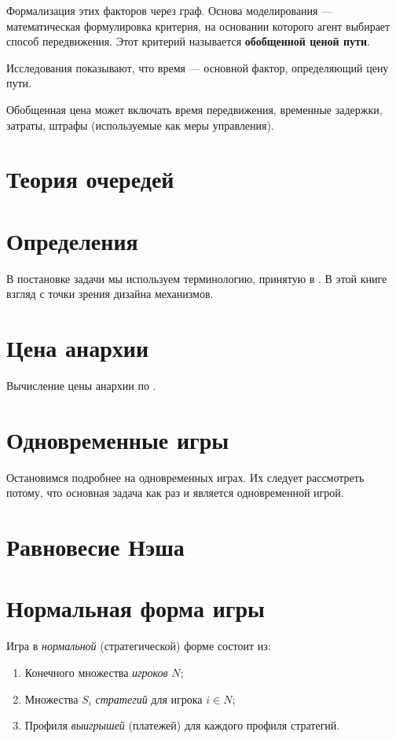 Формализация этих факторов через граф.
Основа моделирования — математическая формулировка критерия, на основании которого агент выбирает способ передвижения. Этот критерий называется \textbf{обобщенной ценой пути}.

Исследования показывают, что время --- основной фактор, определяющий цену пути.\cite[4]{matmod_shvetsov}

Обобщенная цена может включать время передвижения, временные задержки, затраты, штрафы (используемые как меры управления).


\section{Теория очередей}


\section{Определения}
В постановке задачи мы используем терминологию, принятую в \cite[с. 461, Tim Roughgarden, Routing games]{agt2007}.
В этой книге взгляд с точки зрения дизайна механизмов.

\section{Цена анархии}
\cite{rough2001}
\cite{rough2005}

Вычисление цены анархии по \cite[69]{rough2005}.



\section{Одновременные игры}

Остановимся подробнее на одновременных играх. Их следует рассмотреть потому, что основная задача как раз и является одновременной игрой.




\section{Равновесие Нэша}

\section{Нормальная форма игры}
Игра в \textit{нормальной} (стратегической) форме состоит из:
\begin{enumerate}
	\item Конечного множества \textit{игроков} $N$;
	\item Множества $S_i$ \textit{стратегий} для игрока $i\in N$;
	\item Профиля \textit{выигрышей} (платежей) для каждого профиля стратегий.
\end{enumerate}\cite[221]{Association:2018aa}

